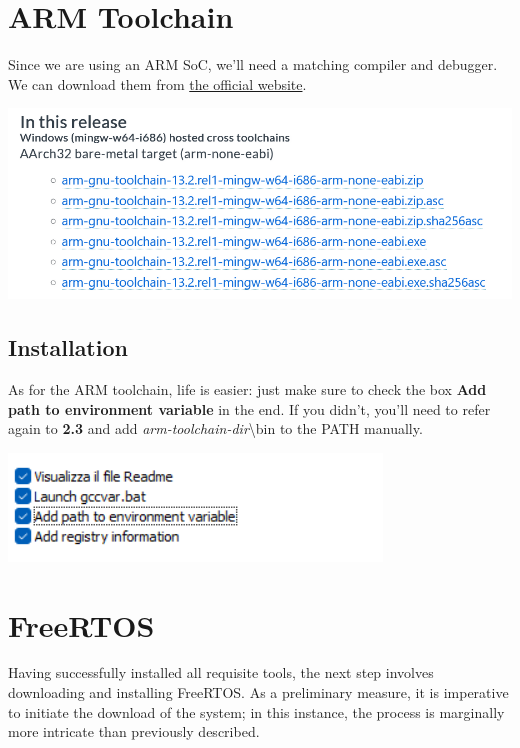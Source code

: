 \documentclass{article}
\begin{document}
\section{ARM Toolchain}

Since we are using an ARM SoC, we'll need a matching compiler and debugger. We can download them from \href{https://developer.arm.com/downloads/-/arm-gnu-toolchain-downloads}{the official website}.

\includegraphics[width=\textwidth]{3a}

\subsection{Installation}
As for the ARM toolchain, life is easier: just make sure to check the box \textbf{Add path to environment variable} in the end. If you didn't, you'll need to refer again to \textbf{2.3} and add \textit{arm-toolchain-dir}\textbackslash bin to the PATH manually.

\includegraphics[width=\textwidth]{3b}

\section{FreeRTOS}

Having successfully installed all requisite tools, the next step involves downloading and installing FreeRTOS. As a preliminary measure, it is imperative to initiate the download of the system; in this instance, the process is marginally more intricate than previously described.
\end{document}
